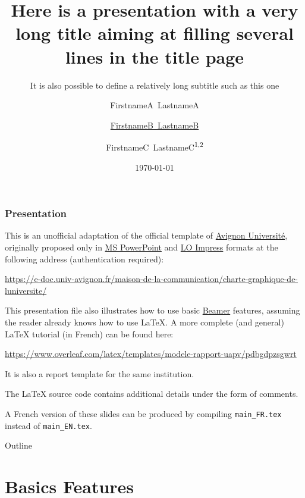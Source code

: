 \documentclass[10pt,    %
    english,            %
    xcolor=table,       %
    envcountsect,       %
    aspectratio=43      %
]{beamer}
\title[Short Title] %
    {Here is a presentation with a very long title aiming at filling several lines in the title page}
\subtitle{It is also possible to define a relatively long subtitle such as this one} %
\date[Short date] %
    {\today}
\author[Short author] %
{FirstnameA~LastnameA\inst{1} \and \underline{FirstnameB~LastnameB}\inst{2} \and FirstnameC~LastnameC\textsuperscript{1,2}}
\institute[] %
{\inst{1} Computer Science Lab, Avignon University -- LIA UPR 4128 \texttt{\{firstname.lastname\}@univ-avignon.fr}
\and \inst{2} Institute of Disruptive Innovation, University of Excellence \texttt{\{firstname.lastname\}@univ-excell.fr}
}
\begin{document}
\begin{frame}
  \titlepage
\end{frame}

\begin{frame}
    \label{frm:first}
    \frametitle{Presentation}
    \smaller[1]
    
    This is an unofficial adaptation of the official template of \href{http://univ-avignon.fr/}{Avignon Université}, originally proposed only in \href{https://en.wikipedia.org/wiki/Microsoft\_PowerPoint}{MS PowerPoint} and \href{https://en.wikipedia.org/wiki/LibreOffice\#Included\_applications}{LO Impress} formats at the following address (authentication required):
    
    \url{https://e-doc.univ-avignon.fr/maison-de-la-communication/charte-graphique-de-luniversite/}
    
    \medskip
    This presentation file also illustrates how to use basic \href{https://en.wikipedia.org/wiki/Beamer_(LaTeX)}{Beamer} features, assuming the reader already knows how to use \LaTeX{}. A more complete (and general) \LaTeX{} tutorial (in French) can be found here: 
    
    \url{https://www.overleaf.com/latex/templates/modele-rapport-uapv/pdbgdpzsgwrt}
    
    It is also a report template for the same institution.
    
    \medskip
    The \LaTeX{} source code contains additional details under the form of comments.
    
    \medskip
    A French version of these slides can be produced by compiling \texttt{main\_FR.tex} instead of \texttt{main\_EN.tex}.
\end{frame}

\begin{frame}{Outline}
    \tableofcontents
\end{frame}












\section{Basics Features}
\label{sec:basics}
\sectionframe
\end{document}
